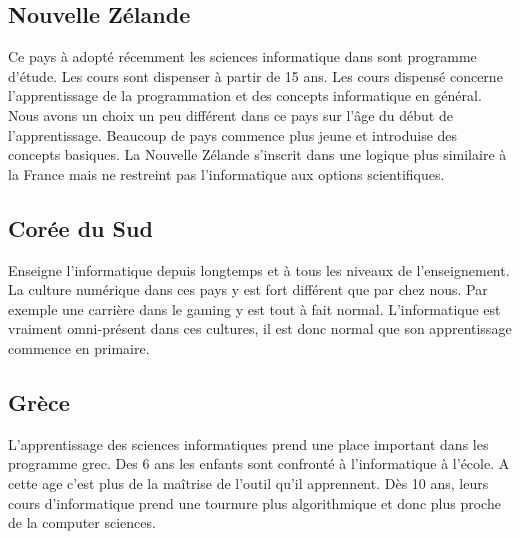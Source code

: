 \subsection{Nouvelle Zélande}
Ce pays à adopté récemment les sciences informatique dans sont programme d'étude. Les cours sont dispenser à partir de 15 ans. Les cours dispensé concerne l'apprentissage de la programmation et des concepts informatique en général. Nous avons un choix un peu différent dans ce pays sur l'âge du début de l'apprentissage. Beaucoup de pays commence plus jeune et introduise des concepts basiques. La Nouvelle Zélande s'inscrit dans une logique plus similaire à la France mais ne restreint pas l'informatique aux options scientifiques.

\subsection{Corée du Sud}
Enseigne l'informatique depuis longtemps et à tous les niveaux de l'enseignement. La culture numérique dans ces pays y est fort différent que par chez nous. Par exemple une carrière dans le gaming y est tout à fait normal. L'informatique est vraiment omni-présent dans ces cultures, il est donc normal que son apprentissage commence en primaire.

\subsection{Grèce}
L'apprentissage des sciences informatiques prend une place important dans les programme grec. Des 6 ans les enfants sont confronté à l'informatique à l'école. A cette age c'est plus de la maîtrise de l'outil qu'il apprennent. Dès 10 ans, leurs cours d'informatique prend une tournure plus algorithmique et donc plus proche de la computer sciences.

